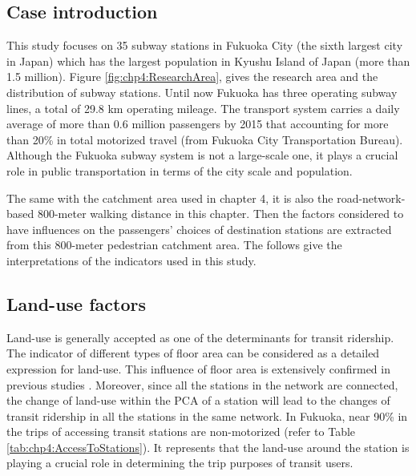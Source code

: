 %
\subsection{Case introduction}
%
This study focuses on 35 subway stations in Fukuoka City (the sixth largest city in Japan) which has the largest population in Kyushu Island of Japan (more than 1.5 million). Figure \ref{fig:chp4:ResearchArea}, gives the research area and the distribution of subway stations. Until now Fukuoka has three operating subway lines, a total of 29.8 km operating mileage. The transport system carries a daily average of more than 0.6 million passengers by 2015 that accounting for more than 20\% in total motorized travel (from Fukuoka City Transportation Bureau). Although the Fukuoka subway system is not a large-scale one, it plays a crucial role in public transportation in terms of the city scale and population. 

%
The same with the catchment area used in chapter 4, it is also the road-network-based 800-meter walking distance in this chapter. Then the factors considered to have influences on the passengers' choices of destination stations are extracted from this 800-meter pedestrian catchment area. The follows give the interpretations of the indicators used in this study.

%
\subsection{Land-use factors}
%
Land-use is generally accepted as one of the determinants for transit ridership. The indicator of different types of floor area can be considered as a detailed expression for land-use. This influence of floor area is extensively confirmed in previous studies \cite{sohn2010factors,gutierrez2011transit,chakraborty2013land,chakraborty2013land,jun2015land}. Moreover, since all the stations in the network are connected, the change of land-use within the PCA of a station will lead to the changes of transit ridership in all the stations in the same network. In Fukuoka, near 90\% in the trips of accessing transit stations are non-motorized (refer to Table \ref{tab:chp4:AccessToStations}). It represents that the land-use around the station is playing a crucial role in determining the trip purposes of transit users.

